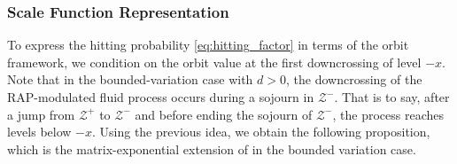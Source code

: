 \documentclass[a4paper,11pt]{article}
\numberwithin{equation}{section}
\theoremstyle{plain}
\theoremstyle{definition}
\newcommand{\1}{\mathbf{1}}
\begin{document}
\subsubsection{Scale Function Representation}

To express the hitting probability \eqref{eq:hitting_factor} in terms of the orbit framework, we condition on the orbit value at the first downcrossing of level $-x$. 
Note that in the bounded-variation case with $d > 0$, the downcrossing of the RAP-modulated fluid process occurs during a sojourn in $\mathcal{Z}^-$. That is to say, after a jump from $\mathcal{Z}^+$ to $\mathcal{Z}^-$ and before ending the sojourn of $\mathcal{Z}^-$, the process reaches levels below $-x$. 
Using the previous idea, we obtain the following proposition, which is the matrix-exponential extension of \cite[Theorem 1]{Ivanovs2021} in the bounded variation case.
\end{document}
